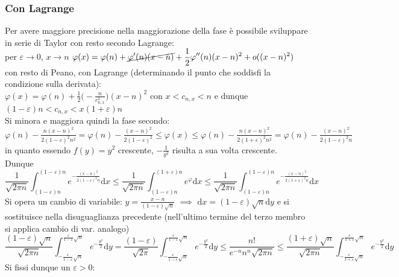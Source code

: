\documentclass[10pt, oneside]{book}
\theoremstyle{plain}
\begin{document}
\subsubsection*{Con Lagrange} Per avere maggiore precisione nella maggiorazione della fase è possibile sviluppare in serie di Taylor con resto secondo Lagrange:
\\per $\varepsilon \rightarrow 0$, $x \rightarrow n$ $\displaystyle \varphi(x) = \varphi(n) + \cancel{\varphi'(n) (x - n)} + \frac{1}{2}\varphi''(n) (x-n)^2 + o((x-n)^2)$ con resto di Peano, con Lagrange (determinando il punto che soddisfi la condizione sulla derivata):
\\$\displaystyle\varphi(x) = \varphi(n) + \frac{1}{2}\big(-\frac{n}{c_{n, x}^2}\big)(x-n)^2$ con $x < c_{n,x} < n$ e dunque $(1-\varepsilon)n < c_{n,x} < x (1+\varepsilon) n$
\\Si minora e maggiora quindi la fase secondo: $\displaystyle \varphi(n) - \frac{n(x - n)^2}{2(1-\varepsilon)^2 n^2} = \varphi(n) - \frac{(x - n)^2}{2(1-\varepsilon)^2} \leq \varphi(x) \leq \varphi(n) - \frac{n(x - n)^2}{2(1+\varepsilon)^2 n^2} = \varphi(n) - \frac{(x - n)^2}{2(1-\varepsilon)^2 n}$ in quanto essendo $f(y) = y^2$ crescente, $- \frac{1}{y^2}$ risulta a sua volta crescente.
\\Dunque
\[\frac{1}{\sqrt{2\pi n}}\int_{(1-\varepsilon)n}^{(1-\varepsilon)n} e^{\displaystyle - \frac{(x-n)^2}{2(1-\varepsilon)^2 n}} \textrm{d}x \leq \frac{1}{\sqrt{2\pi n}}\int_{(1-\varepsilon) n}^{(1+\varepsilon)n} e^{\varphi} \textrm{d}x \leq \frac{1}{\sqrt{2\pi n}}\int_{(1-\varepsilon)n}^{(1-\varepsilon)n} e^{\displaystyle - \frac{(x-n)^2}{2(1+\varepsilon)^2 n}} \textrm{d}x\]
Si opera un cambio di variabile: $\displaystyle y = \frac{x-n}{(1-\varepsilon)\sqrt{n}}$ $\implies$ $\textrm{d}x = (1-\varepsilon)\sqrt{n} \textrm{d}y$ e si sostituisce nella disuguaglianza precedente (nell'ultimo termine del terzo membro si applica cambio di var. analogo)
\[\frac{(1-\varepsilon) \sqrt{n}}{\sqrt{2\pi n}}\int_{- \frac{\varepsilon}{1-\varepsilon}\sqrt{n}}^{\frac{\varepsilon}{1-\varepsilon}\sqrt{n}} e^{\displaystyle - \frac{y^2}{2}} \textrm{d}y = \frac{(1-\varepsilon)}{\sqrt{2\pi}}\int_{ - \frac{\varepsilon}{1-\varepsilon}\sqrt{n}}^{\frac{\varepsilon}{1-\varepsilon}\sqrt{n}} e^{\displaystyle - \frac{y^2}{2}} \textrm{d}y\leq \frac{n!}{e^{-n} n^n \sqrt{2\pi n}} \leq \frac{(1+\varepsilon) \sqrt{n}}{\sqrt{2\pi n}}\int_{- \frac{\varepsilon}{1+\varepsilon}\sqrt{n}}^{\frac{\varepsilon}{1+\varepsilon}\sqrt{n}} e^{\displaystyle - \frac{y^2}{2}} \textrm{d}y\]
Si fissi dunque un $\varepsilon > 0$:
\end{document}
